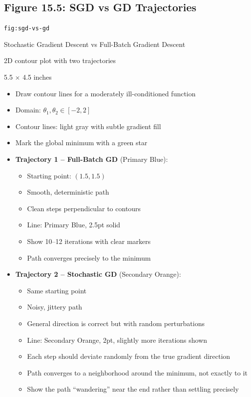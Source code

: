 \documentclass[12pt]{article}
\begin{document}
\subsection{Figure 15.5: SGD vs GD Trajectories}

\begin{description}[style=nextline, leftmargin=0pt]
    \item[Figure ID] \texttt{fig:sgd-vs-gd}
    \item[Title] Stochastic Gradient Descent vs Full-Batch Gradient Descent
    \item[Type] 2D contour plot with two trajectories
    \item[Size] 5.5 $\times$ 4.5 inches

    \item[Visual Description]
    \begin{itemize}
        \item Draw contour lines for a moderately ill-conditioned function
        \item Domain: $\theta_1, \theta_2 \in [-2, 2]$
        \item Contour lines: light gray with subtle gradient fill
        \item Mark the global minimum with a green star

        \item \textbf{Trajectory 1 -- Full-Batch GD} (Primary Blue):
        \begin{itemize}
            \item Starting point: $(1.5, 1.5)$
            \item Smooth, deterministic path
            \item Clean steps perpendicular to contours
            \item Line: Primary Blue, 2.5pt solid
            \item Show 10--12 iterations with clear markers
            \item Path converges precisely to the minimum
        \end{itemize}

        \item \textbf{Trajectory 2 -- Stochastic GD} (Secondary Orange):
        \begin{itemize}
            \item Same starting point
            \item Noisy, jittery path
            \item General direction is correct but with random perturbations
            \item Line: Secondary Orange, 2pt, slightly more iterations shown
            \item Each step should deviate randomly from the true gradient direction
            \item Path converges to a neighborhood around the minimum, not exactly to it
            \item Show the path ``wandering'' near the end rather than settling precisely
        \end{itemize}


\end{itemize}
\end{description}
\end{document}
